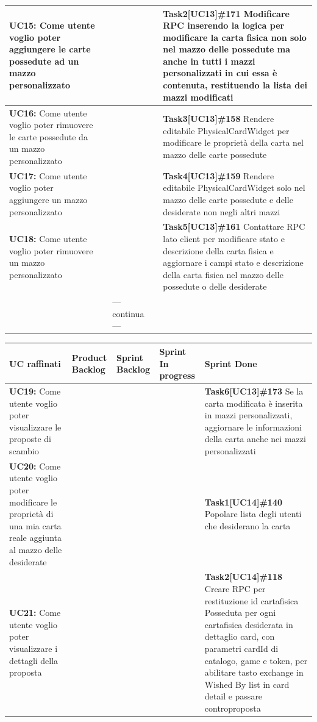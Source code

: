 \documentclass[a4paper, oneside]{article}
\begin{document}
\begin{landscape}
\begin{tabular}{ | p{7cm} | p{3cm} | p{2.8cm} | p{3cm} | p{7.2cm}| }
            \textbf{UC15:}  Come utente voglio poter aggiungere le carte possedute ad un mazzo personalizzato    & &  & & \textbf{Task2[UC13]\#171} Modificare RPC inserendo la logica per modificare la carta fisica non solo nel mazzo delle possedute ma anche in tutti i mazzi personalizzati in cui essa è contenuta, restituendo la lista dei mazzi modificati   \\ \hline
            \textbf{UC16:}  Come utente voglio poter rimuovere le carte possedute da un mazzo personalizzato  & &  & & \textbf{Task3[UC13]\#158} Rendere editabile PhysicalCardWidget per modificare le proprietà della carta nel mazzo delle carte possedute   \\ \hline
            \textbf{UC17:}  Come utente voglio poter aggiungere un mazzo personalizzato   & &  & & \textbf{Task4[UC13]\#159} Rendere editabile PhysicalCardWidget solo nel mazzo delle carte possedute e delle desiderate non negli altri mazzi   \\ \hline
            \textbf{UC18:}  Come utente voglio poter rimuovere un mazzo personalizzato   & &  & & \textbf{Task5[UC13]\#161} Contattare RPC lato client per modificare stato e descrizione della carta fisica e aggiornare i campi stato e descrizione della carta fisica nel mazzo delle possedute o delle desiderate   \\ \hline
            & & --- continua --- & & \\
            \hline
        \end{tabular}
        \newpage
        \small
        \noindent
        \def\arraystretch{2}%
        \begin{tabular}{ | p{7cm} | p{3cm} | p{2.8cm} | p{3cm} | p{7.2cm}| }
            \hline
            \textbf{UC raffinati}
            & \textbf{Product Backlog}
            & \textbf{Sprint Backlog}
            & \textbf{Sprint In progress}
            & \textbf{Sprint Done} \\
            \hline
            \hline
            \textbf{UC19:}  Come utente voglio poter visualizzare le proposte di scambio & &  & & \textbf{Task6[UC13]\#173} Se la carta modificata è inserita in mazzi personalizzati, aggiornare le informazioni della carta anche nei mazzi personalizzati   \\ \hline
            \textbf{UC20:}  Come utente voglio poter modificare le proprietà di una mia carta reale aggiunta al mazzo delle desiderate & &  & & \textbf{Task1[UC14]\#140} Popolare lista degli utenti che desiderano la carta   \\ \hline
            \textbf{UC21:}  Come utente voglio poter visualizzare i dettagli della proposta & &  & & \textbf{Task2[UC14]\#118} Creare RPC per restituzione id cartafisica Posseduta per ogni cartafisica desiderata in dettaglio card, con parametri cardId di catalogo, game e token, per abilitare tasto exchange in Wished By list in card detail e passare controproposta   \\ \hline

\end{tabular}
\end{landscape}
\end{document}
